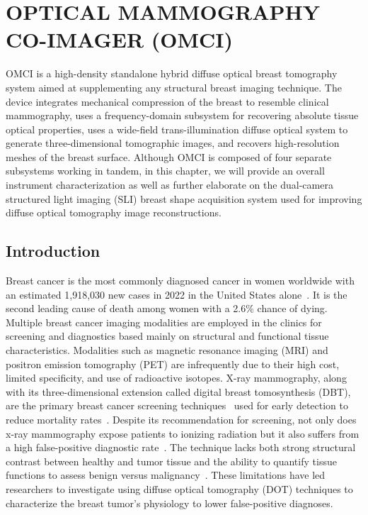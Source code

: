 
\chapter{OPTICAL MAMMOGRAPHY CO-IMAGER (OMCI)} %
\label{chap:omci}
OMCI is a high-density standalone hybrid diffuse optical breast tomography system aimed at supplementing any structural breast imaging technique. The device integrates mechanical compression of the breast to resemble clinical mammography, uses a frequency-domain subsystem for recovering absolute tissue optical properties, uses a wide-field trans-illumination diffuse optical system to generate three-dimensional tomographic images, and recovers high-resolution meshes of the breast surface. Although OMCI is composed of four separate subsystems working in tandem, in this chapter, we will provide an overall instrument characterization as well as further elaborate on the dual-camera structured light imaging (SLI) breast shape acquisition system used for improving diffuse optical tomography image reconstructions.


\section{Introduction} %
\label{chap:omci:introduction}
Breast cancer is the most commonly diagnosed cancer in women worldwide with an estimated 1,918,030 new cases in 2022 in the United States alone~\cite{Siegel2022}. It is the second leading cause of death among women with a 2.6\% chance of dying. Multiple breast cancer imaging modalities are employed in the clinics for screening and diagnostics based mainly on structural and functional tissue characteristics. 
Modalities such as magnetic resonance imaging (MRI) and positron emission tomography (PET) are infrequently due to their high cost, limited specificity, and use of radioactive isotopes. X-ray mammography, along with its three-dimensional extension called digital breast tomosynthesis (DBT), are the primary breast cancer screening techniques~\cite{Secretan2015} used for early detection to reduce mortality rates~\cite{Tabar2003}. Despite its recommendation for screening, not only does x-ray mammography expose patients to ionizing radiation but it also suffers from a high false-positive diagnostic rate~\cite{Tabar2003, Elmore1998}. The technique lacks both strong structural contrast between healthy and tumor tissue and the ability to quantify tissue functions to assess benign versus malignancy~\cite{Leff2008}. These limitations have led researchers to investigate using diffuse optical tomography (DOT) techniques to characterize the breast tumor's physiology to lower false-positive diagnoses. 

